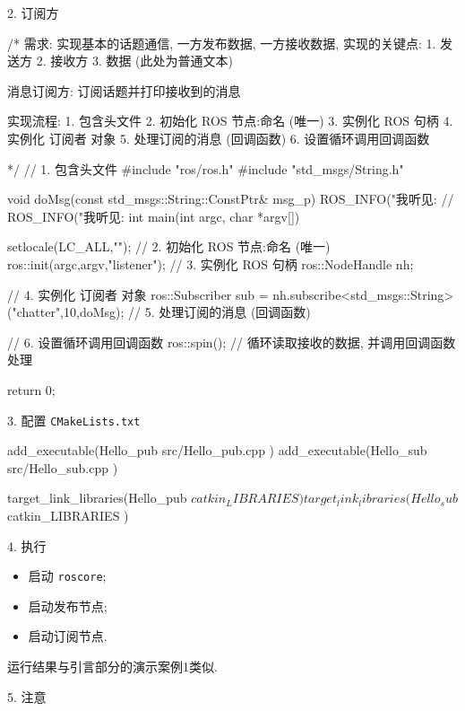 \documentclass[openany, fontset=windowsold]{ctexbook}
\theoremstyle{kaiti}
\theoremstyle{normal}
\begin{document}
2. 订阅方

\begin{cpp}
  /*
      需求: 实现基本的话题通信, 一方发布数据, 一方接收数据, 
          实现的关键点:
          1. 发送方
          2. 接收方
          3. 数据 (此处为普通文本)


      消息订阅方:
          订阅话题并打印接收到的消息

      实现流程:
          1. 包含头文件 
          2. 初始化 ROS 节点:命名 (唯一)
          3. 实例化 ROS 句柄
          4. 实例化 订阅者 对象
          5. 处理订阅的消息 (回调函数)
          6. 设置循环调用回调函数

  */
  // 1. 包含头文件 
  #include "ros/ros.h"
  #include "std_msgs/String.h"

  void doMsg(const std_msgs::String::ConstPtr& msg_p){
      ROS_INFO("我听见:%
      // ROS_INFO("我听见:%
  }
  int main(int argc, char  *argv[])
  {
      setlocale(LC_ALL,"");
      // 2. 初始化 ROS 节点:命名 (唯一)
      ros::init(argc,argv,"listener");
      // 3. 实例化 ROS 句柄
      ros::NodeHandle nh;

      // 4. 实例化 订阅者 对象
      ros::Subscriber sub = nh.subscribe<std_msgs::String>("chatter",10,doMsg);
      // 5. 处理订阅的消息 (回调函数)

      //     6. 设置循环调用回调函数
      ros::spin(); // 循环读取接收的数据, 并调用回调函数处理

      return 0;
  }
\end{cpp}

3. 配置 \verb|CMakeLists.txt|

\begin{bash}
  add_executable(Hello_pub
    src/Hello_pub.cpp
  )
  add_executable(Hello_sub
    src/Hello_sub.cpp
  )

  target_link_libraries(Hello_pub
    ${catkin_LIBRARIES}
  )
  target_link_libraries(Hello_sub
    ${catkin_LIBRARIES}
  )
\end{bash}

4. 执行

\begin{itemize}
  \item 启动 \verb|roscore|;
  \item 启动发布节点;
  \item 启动订阅节点.
\end{itemize}

运行结果与引言部分的演示案例1类似.

5. 注意
\end{document}
